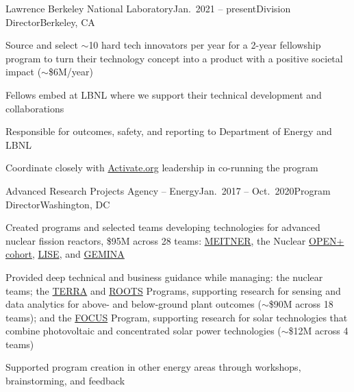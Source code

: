 \begin{rSubsection}{Lawrence Berkeley National Laboratory}{Jan.\ 2021 -- present}{Division Director}{Berkeley, CA}
\item Source and select $\sim$10 hard tech innovators per year for a 2-year fellowship program to turn their technology concept into a product with a positive societal impact ($\sim$\$6M/year) 
\item Fellows embed at LBNL where we support their technical development and collaborations
\item Responsible for outcomes, safety, and reporting to Department of Energy and LBNL
\item Coordinate closely with \href{https://www.activate.org/}{Activate.org} leadership in co-running the program
\end{rSubsection}


\begin{rSubsection}{Advanced Research Projects Agency -- Energy}{Jan.\ 2017 -- Oct.\ 2020}{Program Director}{Washington, DC}
\item Created programs and selected teams developing technologies for advanced nuclear fission reactors, \$95M across 28 teams: 
\href{https://arpa-e.energy.gov/?q=arpa-e-programs/meitner}{MEITNER}, the
Nuclear
\href{https://arpa-e.energy.gov/?q=news-item/arpa-e-announces-12-million-five-projects-nuclear-materials-science}{OPEN+
cohort},
\href{https://arpa-e.energy.gov/?q=news-item/arpa-e-innovating-through-unconventional-ideas}{LISE}, and  \href{https://arpa-e.energy.gov/technologies/programs/gemina}{GEMINA}
\item Provided deep technical and business guidance while managing: the nuclear teams; the \href{https://arpa-e.energy.gov/?q=arpa-e-programs/terra}{TERRA} and \href{https://arpa-e.energy.gov/?q=arpa-e-programs/roots}{ROOTS} Programs, supporting research for sensing and data analytics for above- and below-ground plant outcomes ($\sim$\$90M across 18 teams); and the \href{https://arpa-e.energy.gov/?q=arpa-e-programs/focus}{FOCUS} Program, supporting research for solar technologies that combine photovoltaic and concentrated solar power technologies ($\sim$\$12M across 4 teams)
\item Supported program creation in other energy areas through workshops, brainstorming, and feedback  
\end{rSubsection}


